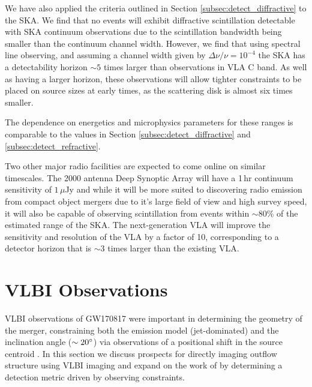 We have also applied the criteria outlined in Section \ref{subsec:detect_diffractive} to the SKA. We find that no events will exhibit diffractive scintillation detectable with SKA continuum observations due to the scintillation bandwidth being smaller than the continuum channel width. However, we find that using spectral line observing, and assuming a channel width given by $\Delta\nu/\nu=10^{-4}$ the SKA has a detectability horizon $\sim 5$ times larger than observations in VLA C band. As well as having a larger horizon, these observations will allow tighter constraints to be placed on source sizes at early times, as the scattering disk is almost six times smaller.

The dependence on energetics and microphysics parameters for these ranges is comparable to the values in Section \ref{subsec:detect_diffractive} and \ref{subsec:detect_refractive}.

Two other major radio facilities are expected to come online on similar timescales. The 2000 antenna Deep Synoptic Array \citep[DSA;][]{2019BAAS...51g.255H} will have a 1\,hr continuum sensitivity of $1\,\mu$Jy and while it will be more suited to discovering radio emission from compact object mergers due to it's large field of view and high survey speed, it will also be capable of observing scintillation from events within $\sim 80\%$ of the estimated range of the SKA. The next-generation VLA \citep[ngVLA;][]{2019BAAS...51g..81M,2019arXiv190310589C,2019BAAS...51c.209C} will improve the sensitivity and resolution of the VLA by a factor of 10, corresponding to a detector horizon that is $\sim 3$ times larger than the existing VLA.




\section{VLBI Observations}
VLBI observations of GW170817 were important in determining the geometry of the merger, constraining both the emission model (jet-dominated) and the inclination angle ($\sim 20\mbox{$^\circ$}$) via observations of a positional shift in the source centroid \citep{2018Natur.561..355M,2019Sci...363..968G}. In this section we discuss prospects for directly imaging outflow structure using VLBI imaging and expand on the work of \citet{2019A&A...631A..39D} by determining a detection metric driven by observing constraints.

